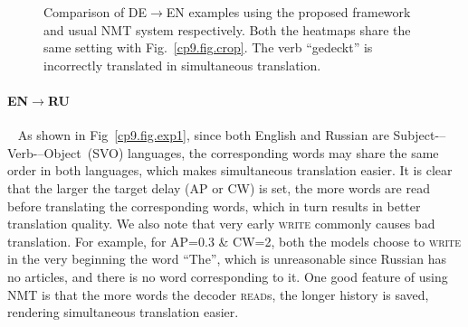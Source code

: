 \begin{figure}[hptb]
\centering
{}
\caption{\label{cp9.fig.deen2}{Comparison of DE$\rightarrow$EN examples using the proposed framework and usual NMT system respectively. Both the heatmaps share the same setting with Fig.~\ref{cp9.fig.crop}}. The verb ``gedeckt'' is incorrectly translated in simultaneous translation.}
\end{figure}
\paragraph{EN$\rightarrow$RU}~ As shown in Fig~\ref{cp9.fig.exp1}, since both English and Russian are Subject-–Verb-–Object~(SVO) languages, the corresponding words may share the same order in both languages, which makes simultaneous translation easier. 
It is clear that the larger the target delay (AP or CW) is set, the more words are read before translating the corresponding words, which in turn results in better translation quality. 
We also note that very early \textsc{write} commonly causes bad translation. For example, for AP=0.3 \& CW=2, both the models choose to \textsc{write} in the very beginning the word ``The'', which is unreasonable since Russian has no articles, and there is no word corresponding to it. One good feature of using NMT is that the more words the decoder \textsc{read}s, the longer history is saved, rendering simultaneous translation easier.

